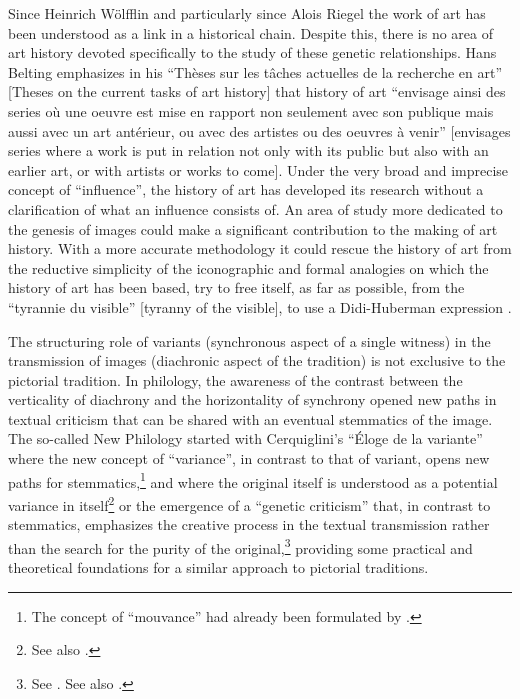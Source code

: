 \documentclass{article}
\begin{document}
Since Heinrich Wölfflin and particularly since Alois Riegel the work of
art has been understood as a link in a historical chain. Despite this,
there is no area of art history devoted specifically to the study of
these genetic relationships. Hans Belting emphasizes in his ``Thèses sur
les tâches actuelles de la recherche en art'' {[}Theses on the current
tasks of art history{]} that history of art ``envisage ainsi des series
où une oeuvre est mise en rapport non seulement avec son publique mais
aussi avec un art antérieur, ou avec des artistes ou des oeuvres à
venir'' {[}envisages series where a work is put in relation not only
with its public but also with an earlier art, or with artists or works
to come{]}\citep[44]{belting_histoire_1989}. Under the
very broad and imprecise concept of ``influence'', the history of art
has developed its research without a clarification of what an influence
consists of. An area of study more dedicated to the genesis of images
could make a significant contribution to the making of art history. With
a more accurate methodology it could rescue the history of art from the
reductive simplicity of the iconographic and formal analogies on which
the history of art has been based, try to free itself, as far as
possible, from the ``tyrannie du visible'' {[}tyranny of the visible{]},
to use a Didi-Huberman expression \citep[64]{didi_devant_1990}.

The structuring role of variants (synchronous aspect of a single
witness) in the transmission of images (diachronic aspect of the
tradition) is not exclusive to the pictorial tradition. In philology,
the awareness of the contrast between the verticality of diachrony and
the horizontality of synchrony opened new paths in textual criticism
that can be shared with an eventual stemmatics of the image. The
so-called New Philology started with Cerquiglini's ``Éloge de la
variante''\citep{cerquiglini_eloge_1989} where
the new concept of ``variance'', in contrast to that of variant, opens
new paths for stemmatics,\footnote{The concept of ``mouvance'' had
  already been formulated by \citet{zumthor_essai_1972}.} and where the original itself is
understood as a potential variance in itself\footnote{See also \citealt{canfora_copista_2002}.} or the
emergence of a ``genetic criticism'' that, in contrast to stemmatics,
emphasizes the creative process in the textual transmission rather than
the search for the purity of the original,\footnote{See \citealt{ferrer_production_2002}. See also
  \citealt{biasi_oeuvre_2017}.} providing some
practical and theoretical foundations for a similar approach to
pictorial traditions.


\begin{flushleft}
    \renewcommand*{\mkbibnamefamily}[1]{\textsc{#1}}
    \renewcommand*{\mkbibnamegiven}[1]{\textsc{#1}} 
\printbibliography
\end{flushleft}
\end{document}
